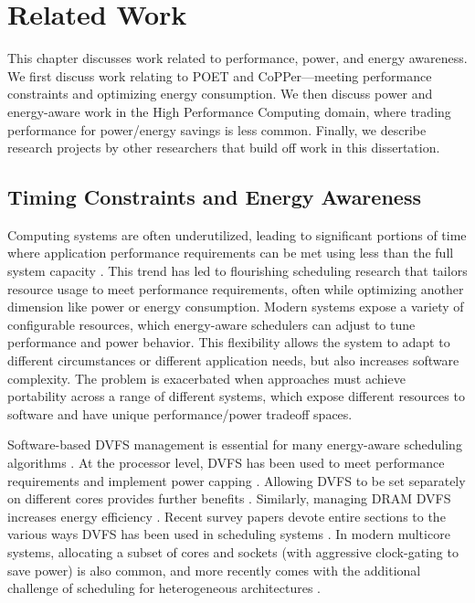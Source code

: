 \chapter{Related Work}
\label{sec:related}

This chapter discusses work related to performance, power, and energy awareness.
We first discuss work relating to POET and CoPPer---meeting performance constraints and optimizing energy consumption.
We then discuss power and energy-aware work in the High Performance Computing domain, where trading performance for power/energy savings is less common.
Finally, we describe research projects by other researchers that build off work in this dissertation.


\section{Timing Constraints and Energy Awareness}

Computing systems are often underutilized, leading to significant portions of time where application performance requirements can be met using less than the full system capacity \cite{google,MeisnerISCA2011}.
This trend has led to flourishing scheduling research that tailors resource usage to meet performance requirements, often while optimizing another dimension like power or energy consumption.
Modern systems expose a variety of configurable resources, which energy-aware schedulers can adjust to tune performance and power behavior.
This flexibility allows the system to adapt to different circumstances or different application needs, but also increases software complexity.
The problem is exacerbated when approaches must achieve portability across a range of different systems, which expose different resources to software and have unique performance/power tradeoff spaces.

Software-based DVFS management is essential for many energy-aware scheduling algorithms \cite{Albers,YDS,Kumar2014}.
At the processor level, DVFS has been used to meet performance requirements \cite{Lu2002,Wu2004} and implement power capping \cite{lefurgy2008power}.
Allowing DVFS to be set separately on different cores provides further benefits \cite{Isci2006,Rangan2009}.
Similarly, managing DRAM DVFS increases energy efficiency \cite{MemScale,Diniz2007}.
Recent survey papers devote entire sections to the various ways DVFS has been used in scheduling systems \cite{MittalSurvey,ZhuralevSurvey}.
In modern multicore systems, allocating a subset of cores and sockets (with aggressive clock-gating to save power) is also common, and more recently comes with the additional challenge of scheduling for heterogeneous architectures \cite{Petrucci2012}.

